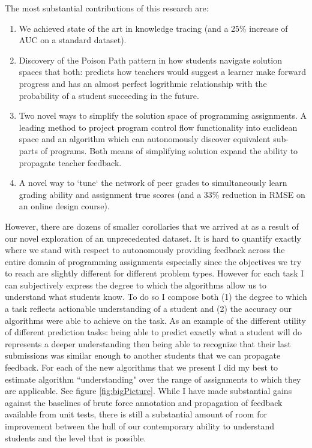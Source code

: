 The most substantial contributions of this research are:
\begin{enumerate}
\item We achieved state of the art in knowledge tracing (and a 25\% increase of AUC on a standard dataset). 

\item Discovery of the Poison Path pattern in how students navigate solution spaces that both: predicts how teachers would suggest a learner make forward progress and has an almost perfect logrithmic relationship with the probability of a student succeeding in the future.

\item Two novel ways to simplify the solution space of programming assignments. A leading method to project program control flow functionality into euclidean space and an algorithm which can autonomously discover equivalent sub-parts of programs. Both means of simplifying solution expand the ability to propagate teacher feedback.

\item A novel way to `tune` the network of peer grades to simultaneously learn grading ability and assignment true scores (and a 33\% reduction in RMSE on an online design course).

\end{enumerate}
However, there are dozens of smaller corollaries that we arrived at as a result of our novel exploration of an unprecedented dataset. It is hard to quantify exactly where we stand with respect to autonomously providing feedback across the entire domain of programming assignments especially since the objectives we try to reach are slightly different for different problem types. However for each task I can subjectively express the degree to which the algorithms allow us to understand what students know. To do so I compose both (1) the degree to which a task reflects actionable understanding of a student and (2) the accuracy our algorithms were able to achieve on the task. As an example of the different utility of different prediction tasks: being able to predict exactly what a student will do represents a deeper understanding then being able to recognize that their last submissions was similar enough to another students that we can propagate feedback. For each of the new algorithms that we present I did my best to estimate algorithm ``understanding" over the range of assignments to which they are applicable. See figure \ref{fig:bigPicture}. While I have made substantial gains against the baselines of brute force annotation and propagation of feedback available from unit tests, there is still a substantial amount of room for improvement between the hull of our contemporary ability to understand students and the level that is possible.

